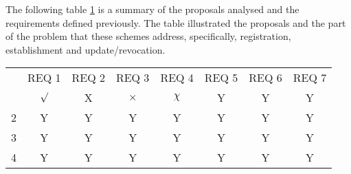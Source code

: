 The following table \ref{table:summaryREQ} is a summary of the proposals analysed and the requirements defined previously.  The table illustrated the proposals and the part of the problem that these schemes address, specifically, registration, establishment and update/revocation. 

\begin{table}[hbt]
\label{table:summaryREQ}
\begin{tabular}{@{}lccccccc@{}}
                           & \multicolumn{1}{l}{\cellcolor[HTML]{C0C0C0}REQ 1} & \multicolumn{1}{l}{\cellcolor[HTML]{C0C0C0}REQ 2} & \multicolumn{1}{l}{\cellcolor[HTML]{C0C0C0}REQ 3} & \multicolumn{1}{l}{\cellcolor[HTML]{C0C0C0}REQ 4} & \multicolumn{1}{l}{\cellcolor[HTML]{C0C0C0}REQ 5} & \multicolumn{1}{l}{\cellcolor[HTML]{C0C0C0}REQ 6} & \multicolumn{1}{l}{\cellcolor[HTML]{C0C0C0}REQ 7} \\
\cellcolor[HTML]{C0C0C0}\cite{burleigh-dtnwg-dtka-01}   & $\surd$                                                 & X                                                 & $\times$                                                 & $\chi$                                                 & Y                                                 & Y                                                 & Y                                                 \\
\cellcolor[HTML]{C0C0C0}2  & Y                                                 & Y                                                 & Y                                                 & Y                                                 & Y                                                 & Y                                                 & Y                                                 \\
\cellcolor[HTML]{C0C0C0}3  & Y                                                 & Y                                                 & Y                                                 & Y                                                 & Y                                                 & Y                                                 & Y                                                 \\
\cellcolor[HTML]{C0C0C0}4  & Y                                                 & Y                                                 & Y                                                 & Y                                                 & Y                                                 & Y                                                 & Y                                                 \\

\end{tabular}
\end{table}

